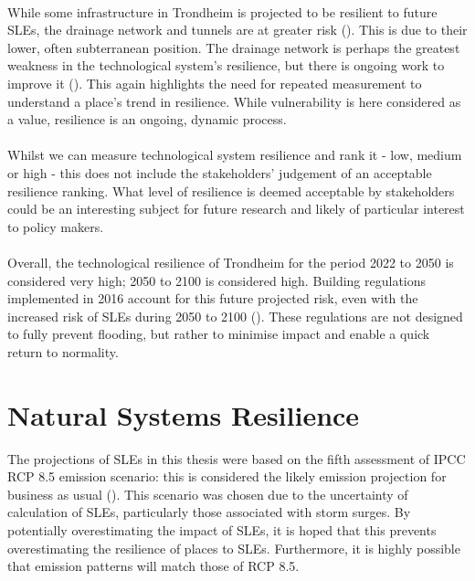 \paragraph{}
While some infrastructure in Trondheim is projected to be resilient to future SLEs, the drainage network and tunnels are at greater risk (\cite{hanssen_saksframlegg_2013}). This is due to their lower, often subterranean position. The drainage network is perhaps the greatest weakness in the technological system's resilience, but there is ongoing work to improve it (\cite{hanssen_saksframlegg_2013}). This again highlights the need for repeated measurement to understand a place's trend in resilience. While vulnerability is here considered as a value, resilience is an ongoing, dynamic process.
\paragraph{}
Whilst we can measure technological system resilience and rank it - low, medium or high - this does not include the stakeholders' judgement of an acceptable resilience ranking. What level of resilience is deemed acceptable by stakeholders could be an interesting subject for future research and likely of particular interest to policy makers.
\paragraph{}
Overall, the technological resilience of Trondheim for the period 2022 to 2050 is considered very high; 2050 to 2100 is considered high. Building regulations implemented in 2016 account for this future projected risk, even with the increased risk of SLEs during 2050 to 2100 (\cite{direktoratet_for_byggkvalitet_direktoratet_2016}). These regulations are not designed to fully prevent flooding, but rather to minimise impact and enable a quick return to normality. 


\section{Natural Systems Resilience}
The projections of SLEs in this thesis were based on the fifth assessment of IPCC RCP 8.5 emission scenario: this is considered the likely emission projection for business as usual (\cite{hanssen-bauer_climate_2017}). This scenario was chosen due to the uncertainty of calculation of SLEs, particularly those associated with storm surges. By potentially overestimating the impact of SLEs, it is hoped that this prevents overestimating the resilience of places to SLEs. Furthermore, it is highly possible that emission patterns will match those of RCP 8.5. 
